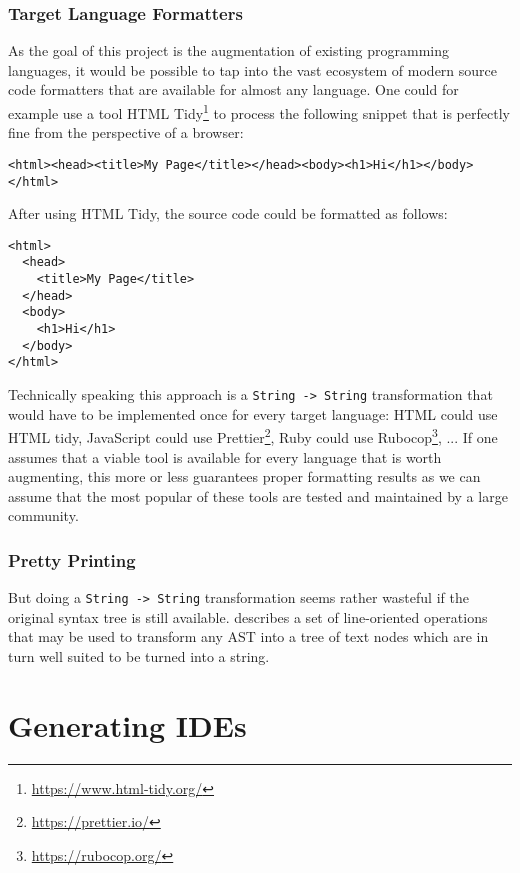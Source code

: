 \subsubsection{Target Language Formatters}

As the goal of this project is the augmentation of existing programming languages, it would be possible to tap into the vast ecosystem of modern source code formatters that are available for almost any language. One could for example use a tool HTML Tidy\footnote{\url{https://www.html-tidy.org/}} to process the following snippet that is perfectly fine from the perspective of a browser:

\begin{verbatim}
<html><head><title>My Page</title></head><body><h1>Hi</h1></body></html>
\end{verbatim}

After using HTML Tidy, the source code could be formatted as follows:

\begin{verbatim}
<html>
  <head>
    <title>My Page</title>
  </head>
  <body>
    <h1>Hi</h1>
  </body>
</html>
\end{verbatim}

Technically speaking this approach is a \texttt{String -> String} transformation that would have to be implemented once for every target language: HTML could use HTML tidy, JavaScript could use Prettier\footnote{\url{https://prettier.io/}}, Ruby could use Rubocop\footnote{\url{https://rubocop.org/}}, ... If one assumes that a viable tool is available for every language that is worth augmenting, this more or less guarantees proper formatting results as we can assume that the most popular of these tools are tested and maintained by a large community.

\subsubsection{Pretty Printing}

But doing a \texttt{String -> String} transformation seems rather wasteful if the original syntax tree is still available. \cite{wadler_prettier_printer} describes a set of line-oriented operations that may be used to transform any AST into a tree of text nodes which are in turn well suited to be turned into a string.

\section{Generating IDEs}

